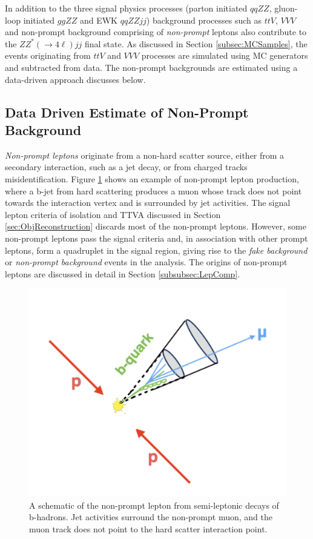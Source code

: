 In addition to the three signal physics processes (parton initiated $qqZZ$, gluon-loop initiated $ggZZ$ and EWK $qqZZjj$) background processes such as $ttV$, $VVV$ and non-prompt background comprising of \textit{non-prompt} leptons also contribute to the $ZZ^*(\rightarrow 4\ell) jj$ final state. As discussed in Section \ref{subsec:MCSamples}, the events originating from $ttV$ and $VVV$ processes are simulated using MC generators and subtracted from data. The non-prompt backgrounds are estimated using a data-driven approach discusses below. 

\subsection{Data Driven Estimate of Non-Prompt Background}
\label{subsec:FakeBackground}

\textit{Non-prompt leptons} originate from a non-hard scatter source, either from a secondary interaction, such as a jet decay, or from charged tracks misidentification. Figure \ref{fig:NonPromptLepton} shows an example of non-prompt lepton production, where a b-jet from hard scattering produces a muon whose track does not point towards the interaction vertex and is surrounded by jet activities. The signal lepton criteria of isolation and TTVA discussed in Section \ref{sec:ObjReconstruction} discards most of the non-prompt leptons. However, some non-prompt leptons pass the signal criteria and, in association with other prompt leptons, form a quadruplet in the signal region, giving rise to the \textit{fake background} or \textit{non-prompt background} events in the analysis. The origins of non-prompt leptons are discussed in detail in Section \ref{subsubsec:LepComp}.

\begin{figure}[!htb]
    \centering
    \includegraphics[width=.7\linewidth]{figures/Analysis/Background/NonPromptLeptonExample.png}  
    \caption{A schematic of the non-prompt lepton from semi-leptonic decays of b-hadrons. Jet activities surround the non-prompt muon, and the muon track does not point to the hard scatter interaction point.\label{fig:NonPromptLepton}}
\end{figure}

